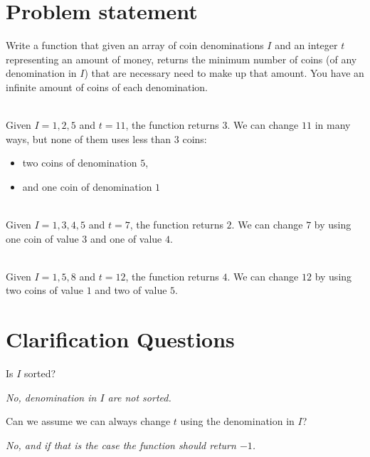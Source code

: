 \section{Problem statement}
\begin{exercise}
Write a function that given an array of coin denominations $I$ and an integer $t$ representing an amount of money, returns
the minimum number of coins (of any denomination in $I$) that are necessary need to make up that amount. 
You have an infinite amount of coins of each denomination. 
	\begin{example}
		\label{ex:coin_change:example1}
		\hfill \\
		Given $I={1,2,5}$ and $t=11$, the function returns $3$.
		We can change $11$ in many ways, but none of them uses less than $3$ coins:
		\begin{itemize}
			\item two coins of denomination $5$,
			\item and one coin of denomination $1$
		\end{itemize}
	\end{example}

	\begin{example}
		\hfill \\
		Given $I={1,3,4,5}$ and $t=7$, the function returns $2$.
		We can change $7$ by using one coin of value $3$ and one of value $4$.
	\end{example}

	\begin{example}
		\label{ex:coin_change:example3}
		\hfill \\
		Given $I={1,5,8}$ and $t=12$, the function returns $4$.
		We can change $12$ by using two coins of value $1$ and two of value $5$.
	\end{example}
\end{exercise}

\section{Clarification Questions}

\begin{QandA}
	\item Is $I$ sorted?
	\begin{answered}
		\textit{No, denomination in $I$ are not sorted.}
	\end{answered}

	\item Can we assume we can always change $t$ using the denomination in $I$?
	\begin{answered}
		\textit{No, and if that is the case the function should return $-1$.}
	\end{answered}
	
\end{QandA}

